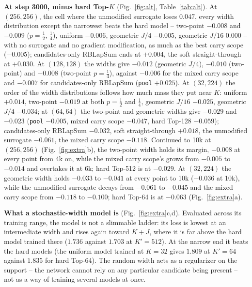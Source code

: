 \documentclass[10pt,a4paper]{article}
\newcommand{\code}[1]{\texttt{#1}}
\begin{document}
\textbf{At step 3000, minus hard Top-\(K\)} (Fig.~\ref{fig:alt}, Table~\ref{tab:alt}).  At \((256,256)\), the cell
where the unmodified surrogate loses \(0.047\), every width distribution except the narrowest beats the hard model
-- two-point \(-0.008\) and \(-0.009\) (\(p=\tfrac12\), \(\tfrac14\)), uniform \(-0.006\), geometric \(J/4\) \(-0.005\),
geometric \(J/16\) \(0.000\) -- with no surrogate and no gradient modification, as much as the best carry scope
(\(-0.005\)); candidates-only RBLapSum ends at \(+0.004\), the soft straight-through at \(+0.030\).  At \((128,128)\)
the widths give \(-0.012\) (geometric \(J/4\)), \(-0.010\) (two-point) and \(-0.008\) (two-point \(p=\tfrac14\)),
against \(-0.006\) for the mixed carry scope and \(-0.007\) for candidates-only RBLapSum (\code{pool} \(+0.025\)).  At \((32,224)\) the order of the width
distributions follows how much mass they put near \(K\): uniform \(+0.014\), two-point \(-0.019\) at both \(p=\tfrac12\)
and \(\tfrac14\), geometric \(J/16\) \(-0.025\), geometric \(J/4\) \(-0.034\); at \((64,64)\) the two-point and geometric widths give
\(-0.029\) and \(-0.023\) (\code{pool} \(-0.005\), mixed carry scope \(-0.047\), hard Top-128 \(-0.059\)); candidates-only RBLapSum \(-0.032\), soft
straight-through \(+0.018\), the unmodified surrogate \(-0.061\), the mixed carry scope \(-0.118\).
Continued to 10k at \((256,256)\) (Fig.~\ref{fig:extra}b), the two-point width holds its margin, \(-0.008\) at every
point from 4k on, while the mixed carry scope's grows from \(-0.005\) to \(-0.014\) and overtakes it at 6k; hard
Top-512 is at \(-0.029\).  At \((32,224)\) the geometric width holds \(-0.033\) to \(-0.041\) at every point to
10k (\(-0.036\) at 10k), while the unmodified surrogate decays from \(-0.061\) to \(-0.045\) and the mixed carry
scope from \(-0.118\) to \(-0.100\); hard Top-64 is at \(-0.063\) (Fig.~\ref{fig:extra}a).





\textbf{What a stochastic-width model is} (Fig.~\ref{fig:extra}c,d).  Evaluated across its training range, the model
is not a slimmable ladder: its loss is lowest at an intermediate width and rises again toward \(K{+}J\), where it is
far above the hard model trained there (\(1.736\) against \(1.703\) at \(K'=512\)).  At the narrow end it beats the hard
models (the uniform model trained at \(K=32\) gives \(1.809\) at \(K'=64\) against \(1.835\) for hard Top-64).  The
random width acts as a regularizer on the support -- the network cannot rely on any particular candidate being
present -- not as a way of training several models at once.
\end{document}
